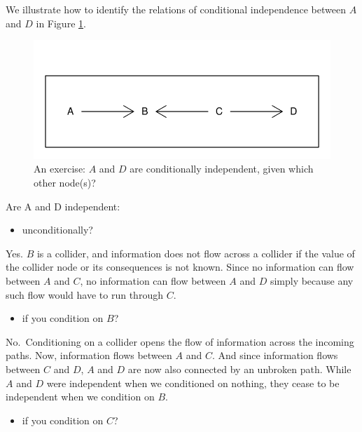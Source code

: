 \documentclass[
  12pt,
]{book}
\providecommand{\tightlist}{%
  \setlength{\itemsep}{0pt}\setlength{\parskip}{0pt}}
\begin{document}
We illustrate how to identify the relations of conditional independence between \(A\) and \(D\) in Figure \ref{fig:exercise}.

\begin{figure}

{\centering \includegraphics[width=0.8\linewidth]{ii_files/figure-latex/exercise-1} 

}

\caption{\label{fig:CItest} An exercise: $A$ and $D$ are conditionally independent, given which other node(s)?}\label{fig:exercise}
\end{figure}

Are A and D independent:

\begin{itemize}
\tightlist
\item
  unconditionally?
\end{itemize}

Yes. \(B\) is a collider, and information does not flow across a collider if the value of the collider node or its consequences is not known. Since no information can flow between \(A\) and \(C\), no information can flow between \(A\) and \(D\) simply because any such flow would have to run through \(C\).

\begin{itemize}
\tightlist
\item
  if you condition on \(B\)?
\end{itemize}

No.~Conditioning on a collider opens the flow of information across the incoming paths. Now, information flows between \(A\) and \(C\). And since information flows between \(C\) and \(D\), \(A\) and \(D\) are now also connected by an unbroken path. While \(A\) and \(D\) were independent when we conditioned on nothing, they cease to be independent when we condition on \(B\).

\begin{itemize}
\tightlist
\item
  if you condition on \(C\)?
\end{itemize}
\end{document}
